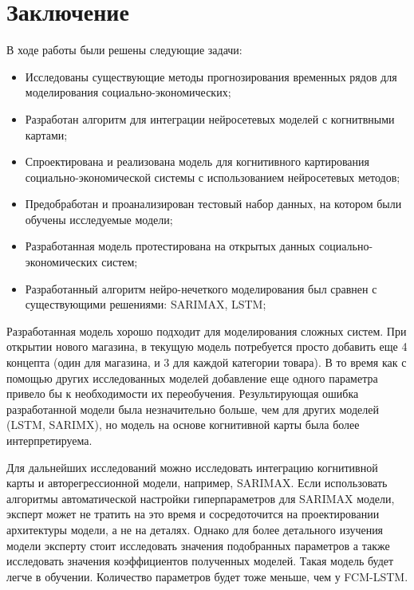 \chapter*{Заключение}

В ходе работы были решены следующие задачи:


\begin{itemize}
	\item Исследованы существующие методы прогнозирования временных рядов для моделирования социально-экономических;
	\item Разработан алгоритм для интеграции нейросетевых моделей с когнитвными картами;
	\item Спроектирована и реализована модель для когнитивного картирования социально-экономической
	системы с использованием нейросетевых методов;
	\item Предобработан и проанализирован тестовый набор данных, на котором были обучены исследуемые модели;
	\item Разработанная модель протестирована на открытых данных социально-экономических систем;
	\item Разработанный алгоритм нейро-нечеткого моделирования был сравнен с существующими решениями: SARIMAX, LSTM;
\end{itemize}

Разработанная модель хорошо подходит для моделирования сложных систем.
При открытии нового магазина, в текущую модель потребуется просто добавить еще
4 концепта (один для магазина, и 3 для каждой категории товара). В то время
как с помощью других исследованных моделей добавление еще одного параметра
привело бы к необходимости их переобучения.
Результирующая ошибка разработанной модели была незначительно больше,
чем для других моделей (LSTM, SARIMX), но модель на основе когнитивной карты
была более интерпретируема.

Для дальнейших исследований можно исследовать интеграцию когнитивной карты
и авторегрессионной модели, например, SARIMAX. Если использовать алгоритмы
автоматической настройки гиперпараметров для SARIMAX модели, эксперт может не тратить
на это время и сосредоточится на проектировании архитектуры модели, а не на деталях.
Однако для более детального изучения модели эксперту стоит исследовать
значения подобранных параметров а также исследовать значения
коэффициентов полученных моделей. Такая модель будет легче в
обучении. Количество параметров будет тоже меньше, чем у FCM-LSTM.

